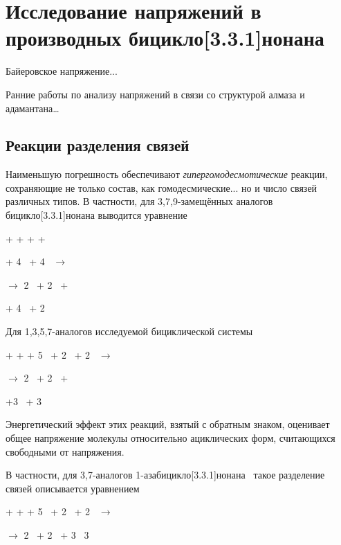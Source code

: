 \chapter{Исследование напряжений в производных бицикло[3.3.1]нонана}\label{ch:Strain:331}

Байеровское напряжение...

Ранние работы по анализу напряжений в связи со структурой алмаза и адамантана\dots~\cite{Mohr:1918}

\section{Реакции разделения связей} 

Наименьшую погрешность обеспечивают \emph{гипергомодесмотические} реакции, сохраняющие не только состав, как гомодесмические... но и число связей различных типов. В частности, для 3,7,9-замещённых аналогов бицикло[3.3.1]нонана выводится уравнение
\begin{center}
 + \DrawMeXMe{} + \DrawMeYMe{} + \DrawMeZMe{} +

+ 4~\DrawPropane{} + 4~\DrawIsoButane{}
  \(\longrightarrow\)
  
\(\longrightarrow\) 2~ + 2~ +

+ 4~\DrawIsoPentane{} + 2~
\end{center}

Для 1,3,5,7-аналогов исследуемой бициклической системы
\begin{center}
   + \DrawMeXMe{} + \DrawMeYMe{} + 5~\DrawPropane{} + 2~ + 2~
  \(\longrightarrow\)
  
  \(\longrightarrow\) 2~ + 2~ +
  
  +3~ + 3~
\end{center}

Энергетический эффект этих реакций, взятый с обратным знаком, оценивает общее напряжение молекулы относительно ациклических форм, считающихся свободными от напряжения. 

В частности, для 3,7-аналогов 1-азабицикло[3.3.1]нонана~ такое разделение связей описывается уравнением
\begin{center}
  + \DrawMeXMe{} + \DrawMeYMe{} + 5~\DrawPropane{}
  + 2~\DrawIsoButane{} + 2~\DrawMeNMeMe{}
  \(\longrightarrow\)
  
  \(\longrightarrow\) 
  2~ + 2~ + 3~\DrawIsoPentane{}
  3~\DrawMeNMeEt{}
\end{center}

